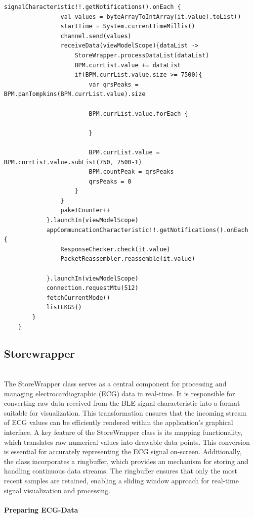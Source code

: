 {\begin{lstlisting}[label={fig:simpleSourceGen.cs}, caption={Connect functionality code }]
			signalCharacteristic!!.getNotifications().onEach {
				val values = byteArrayToIntArray(it.value).toList()
				startTime = System.currentTimeMillis()
				channel.send(values)
				receiveData(viewModelScope){dataList ->
					StoreWrapper.processDataList(dataList)
					BPM.currList.value += dataList
					if(BPM.currList.value.size >= 7500){
						var qrsPeaks = BPM.panTompkins(BPM.currList.value).size
						
						BPM.currList.value.forEach {
							
						}
						
						BPM.currList.value = BPM.currList.value.subList(750, 7500-1)
						BPM.countPeak = qrsPeaks
						qrsPeaks = 0
					}
				}
				paketCounter++
			}.launchIn(viewModelScope)
			appCommuncationCharacteristic!!.getNotifications().onEach {
				ResponseChecker.check(it.value)
				PacketReassembler.reassemble(it.value)
				
			}.launchIn(viewModelScope)
			connection.requestMtu(512)
			fetchCurrentMode()
			listEKGS()
		}
	}
\end{lstlisting}


\subsection{Storewrapper}\mbox{}\\
The StoreWrapper class serves as a central component for processing and managing electrocardiographic (ECG) data in real-time. It is responsible for converting raw data received from the BLE signal characteristic into a format suitable for visualization. This transformation ensures that the incoming stream of ECG values can be efficiently rendered within the application’s graphical interface.
A key feature of the StoreWrapper class is its mapping functionality, which translates raw numerical values into drawable data points. This conversion is essential for accurately representing the ECG signal on-screen. Additionally, the class incorporates a ringbuffer, which provides an mechanism for storing and handling continuous data streams. The ringbuffer ensures that only the most recent samples are retained, enabling a sliding window approach for real-time signal visualization and processing.



\paragraph{Preparing ECG-Data}\mbox{}\\
{\large
	
}}
